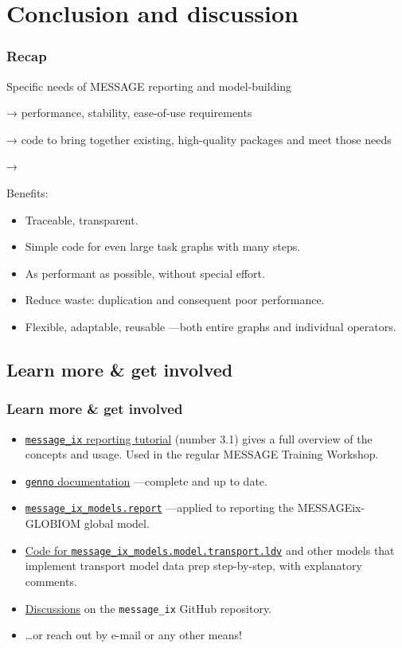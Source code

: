 \documentclass[12pt,aspectratio=169]{beamer}
\renewcommand{\mod}[1]{\texttt{#1}}
\begin{document}
\section{Conclusion and discussion}

\begin{frame}
\frametitle{Recap}

Specific needs of MESSAGE reporting and model-building

→ performance, stability, ease-of-use requirements

→ code to bring together existing, high-quality packages and meet those needs

→ 

\bigskip
Benefits:
\begin{itemize}
  \item Traceable, transparent.
  \item Simple code for even large task graphs with many steps.
  \item As performant as possible, without special effort.
  \item Reduce waste: duplication and consequent poor performance.
  \item Flexible, adaptable, reusable —both entire graphs and individual operators.
\end{itemize}

\end{frame}

\subsection{Learn more \& get involved}

\begin{frame}
\frametitle{Learn more \& get involved}

\begin{itemize}
  \item \href{https://docs.messageix.org/en/latest/tutorials.html\#westeros-electrified}{\mod{message_ix} reporting tutorial} (number 3.1)
    gives a full overview of the concepts and usage.
    Used in the regular MESSAGE Training Workshop.
  \item \href{https://genno.readthedocs.io/en/latest/}{\mod{genno} documentation} —complete and up to date.
  \item \href{https://docs.messageix.org/projects/models/en/latest/api/report/index.html}{\mod{message_ix_models.report}}
    —applied to reporting the MESSAGEix-GLOBIOM global model.
  \item \href{https://github.com/iiasa/message-ix-models/blob/main/message_ix_models/model/transport/ldv.py}{Code for \mod{message_ix_models.model.transport.ldv}}
    and other models that implement transport model data prep step-by-step, with explanatory comments.
  \item \href{https://github.com/iiasa/message_ix/discussions}{Discussions} on the \mod{message_ix} GitHub repository.
  \item …or reach out by e-mail or any other means!
\end{itemize}
\end{frame}

\makefinalslide
\end{document}
